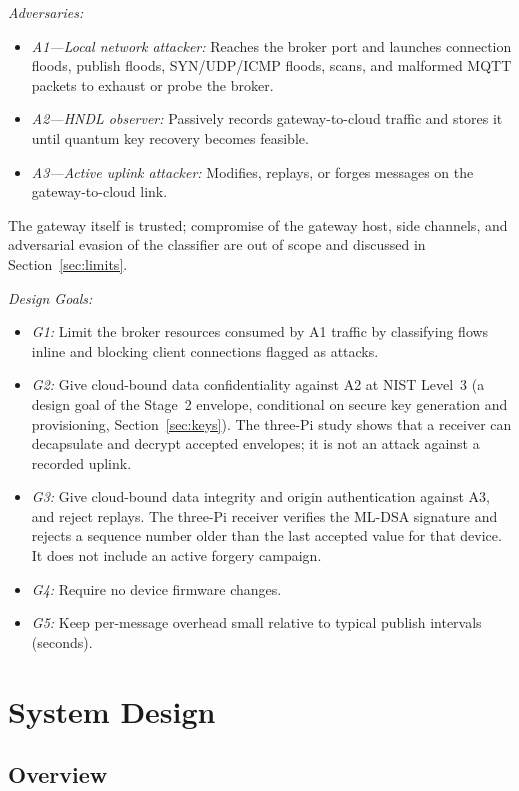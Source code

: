 \documentclass[journal]{IEEEtran}
\begin{document}
\textit{Adversaries:}
\begin{itemize}
  \item \textit{A1---Local network attacker:} Reaches the broker port and launches connection floods, publish floods, SYN/UDP/ICMP floods, scans, and malformed MQTT packets to exhaust or probe the broker.
  \item \textit{A2---HNDL observer:} Passively records gateway-to-cloud traffic and stores it until quantum key recovery becomes feasible.
  \item \textit{A3---Active uplink attacker:} Modifies, replays, or forges messages on the gateway-to-cloud link.
\end{itemize}
The gateway itself is trusted; compromise of the gateway host, side channels, and adversarial evasion of the classifier are out of scope and discussed in Section~\ref{sec:limits}.

\textit{Design Goals:}
\begin{itemize}
  \item \textit{G1:} Limit the broker resources consumed by A1 traffic by classifying flows inline and blocking client connections flagged as attacks.
  \item \textit{G2:} Give cloud-bound data confidentiality against A2 at NIST Level~3 (a design goal of the Stage~2 envelope, conditional on secure key generation and provisioning, Section~\ref{sec:keys}). The three-Pi study shows that a receiver can decapsulate and decrypt accepted envelopes; it is not an attack against a recorded uplink.
  \item \textit{G3:} Give cloud-bound data integrity and origin authentication against A3, and reject replays. The three-Pi receiver verifies the ML-DSA signature and rejects a sequence number older than the last accepted value for that device. It does not include an active forgery campaign.
  \item \textit{G4:} Require no device firmware changes.
  \item \textit{G5:} Keep per-message overhead small relative to typical publish intervals (seconds).
\end{itemize}

\section{System Design}
\label{sec:design}

\subsection{Overview}
\end{document}
